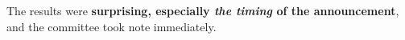\documentclass{article}
\begin{document}
The results were \textbf{surprising, especially \textit{the timing} of
the announcement}, and the committee took note immediately.
\end{document}
